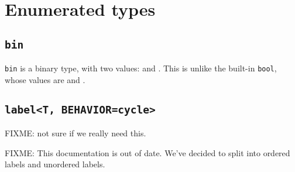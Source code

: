 
\section{Enumerated types}

\subsection{\lstinline$bin$}

\lstinline$bin$ is a binary type, with two values: 
and .  This is unlike the built-in \lstinline$bool$, whose
values are  and .

\subsection{\lstinline$label<T, BEHAVIOR=cycle>$}

FIXME: not sure if we really need this.

FIXME: This documentation is out of date.  We've decided to split
 into ordered labels and unordered labels.

